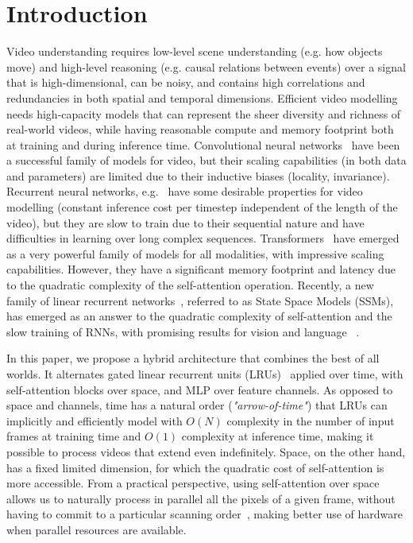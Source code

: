 \vspace{-10mm}
\section{Introduction}
\label{sec:intro}
\vspace{-2mm}

Video understanding requires low-level scene understanding (e.g. how objects move) and high-level reasoning (e.g. causal relations between events) over a signal that is high-dimensional, can be noisy, and contains high correlations and redundancies in both spatial and temporal dimensions. Efficient video modelling needs high-capacity models that can represent the sheer diversity and richness of real-world videos, while having reasonable compute and memory footprint both at training and during inference time. Convolutional neural networks~\citep{i3d,slowfast} have been a successful family of models for video, but their scaling capabilities (in both data and parameters) are limited due to their inductive biases (locality, invariance). Recurrent neural networks, e.g.~\citep{SrivastavaLSTM,patraucean2015spatio} have some desirable properties for video modelling (constant inference cost per timestep independent of the length of the video), but they are slow to train due to their sequential nature and have difficulties in learning over long complex sequences. Transformers~\citep{vaswani2017attention} have emerged as a very powerful family of models for all modalities, with impressive scaling capabilities. However, they have a significant memory footprint and latency due to the quadratic complexity of the self-attention operation.
%
Recently, a new family of linear recurrent networks~\citep{gu2020hippo,gu2023mamba, orvieto2023resurrecting,Beck2024xLSTM}, referred to as State Space Models (SSMs), has emerged as an answer to the quadratic complexity of self-attention and the slow training of RNNs, with promising results for vision and language ~\cite{de2024griffinmixinggatedlinear,li2024videomambastatespacemodel}. 

In this paper, we propose a hybrid architecture that combines the best of all worlds. It alternates gated linear recurrent units (LRUs)~\citep{de2024griffinmixinggatedlinear} applied over time, with self-attention blocks over space, and MLP over feature channels. As opposed to space and channels, time has a natural order (\textit{"arrow-of-time"}) that LRUs can implicitly and efficiently model with $O(N)$ complexity in the number of input frames at training time and $O(1)$ complexity at inference time, making it possible to process videos that extend even indefinitely. Space, on the other hand, has a fixed limited dimension, for which the quadratic cost of self-attention is more accessible. From a practical perspective, using self-attention over space allows us to naturally process in parallel all the pixels of a given frame, without having to commit to a particular scanning order~\cite{li2024videomambastatespacemodel}, making better use of  hardware when parallel resources are available.
 
